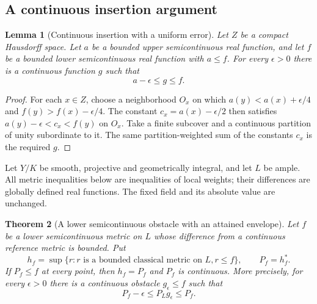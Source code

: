 \documentclass[11pt,a4paper]{article}
\numberwithin{equation}{section}
\newtheorem{theorem}{Theorem}[section]
\newtheorem{lemma}[theorem]{Lemma}
\theoremstyle{definition}
\theoremstyle{remark}
\begin{document}
\subsection{A continuous insertion argument}

\begin{lemma}[Continuous insertion with a uniform error]
\label{lem:r3-continuous-insertion}
Let $Z$ be a compact Hausdorff space. Let $a$ be a bounded upper
semicontinuous real function, and let $f$ be a bounded lower
semicontinuous real function with $a\leq f$. For every $\epsilon>0$
there is a continuous function $g$ such that
\[
 a-\epsilon\leq g\leq f.
\]
\end{lemma}

\begin{proof}
For each $x\in Z$, choose a neighborhood $O_x$ on which
$a(y)<a(x)+\epsilon/4$ and $f(y)>f(x)-\epsilon/4$.
The constant $c_x=a(x)-\epsilon/2$ then satisfies
$a(y)-\epsilon<c_x<f(y)$ on $O_x$. Take a finite subcover
and a continuous partition of unity subordinate to it. The same
partition-weighted sum of the constants $c_x$ is the required $g$.
\end{proof}

Let $Y/K$ be smooth, projective and geometrically integral, and let
$L$ be ample. All metric inequalities below are inequalities of local
weights; their differences are globally defined real functions.
The fixed field and its absolute value are unchanged.

\begin{theorem}[A lower semicontinuous obstacle with an attained envelope]
\label{thm:r3-lsc-obstacle-continuity}
Let $f$ be a lower semicontinuous metric on $L$ whose difference from
a continuous reference metric is bounded. Put
\[
 h_f=\sup\{r:r\text{ is a bounded classical metric on }L, r\leq f\},
 \qquad P_f=h_f^*.
\]
If $P_f\leq f$ at every point, then $h_f=P_f$ and $P_f$ is continuous.
More precisely, for every $\epsilon>0$ there is a continuous obstacle
$g_\epsilon\leq f$ such that
\[
 P_f-\epsilon\leq P_Lg_\epsilon\leq P_f.
\]
\end{theorem}
\end{document}
